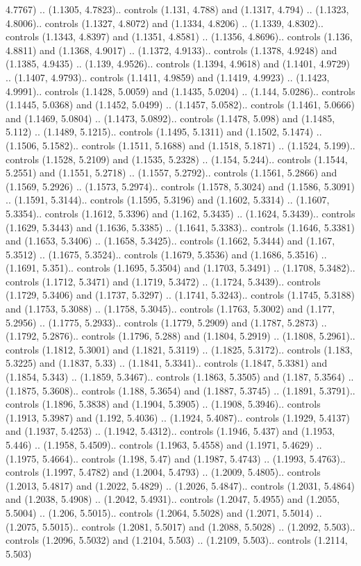 4.7767) .. (1.1305, 4.7823).. controls (1.131, 4.788) and (1.1317, 4.794) .. (1.1323, 4.8006).. controls (1.1327, 4.8072) and (1.1334, 4.8206) .. (1.1339, 4.8302).. controls (1.1343, 4.8397) and (1.1351, 4.8581) .. (1.1356, 4.8696).. controls (1.136, 4.8811) and (1.1368, 4.9017) .. (1.1372, 4.9133).. controls (1.1378, 4.9248) and (1.1385, 4.9435) .. (1.139, 4.9526).. controls (1.1394, 4.9618) and (1.1401, 4.9729) .. (1.1407, 4.9793).. controls (1.1411, 4.9859) and (1.1419, 4.9923) .. (1.1423, 4.9991).. controls (1.1428, 5.0059) and (1.1435, 5.0204) .. (1.144, 5.0286).. controls (1.1445, 5.0368) and (1.1452, 5.0499) .. (1.1457, 5.0582).. controls (1.1461, 5.0666) and (1.1469, 5.0804) .. (1.1473, 5.0892).. controls (1.1478, 5.098) and (1.1485, 5.112) .. (1.1489, 5.1215).. controls (1.1495, 5.1311) and (1.1502, 5.1474) .. (1.1506, 5.1582).. controls (1.1511, 5.1688) and (1.1518, 5.1871) .. (1.1524, 5.199).. controls (1.1528, 5.2109) and (1.1535, 5.2328) .. (1.154, 5.244).. controls (1.1544, 5.2551) and (1.1551, 5.2718) .. (1.1557, 5.2792).. controls (1.1561, 5.2866) and (1.1569, 5.2926) .. (1.1573, 5.2974).. controls (1.1578, 5.3024) and (1.1586, 5.3091) .. (1.1591, 5.3144).. controls (1.1595, 5.3196) and (1.1602, 5.3314) .. (1.1607, 5.3354).. controls (1.1612, 5.3396) and (1.162, 5.3435) .. (1.1624, 5.3439).. controls (1.1629, 5.3443) and (1.1636, 5.3385) .. (1.1641, 5.3383).. controls (1.1646, 5.3381) and (1.1653, 5.3406) .. (1.1658, 5.3425).. controls (1.1662, 5.3444) and (1.167, 5.3512) .. (1.1675, 5.3524).. controls (1.1679, 5.3536) and (1.1686, 5.3516) .. (1.1691, 5.351).. controls (1.1695, 5.3504) and (1.1703, 5.3491) .. (1.1708, 5.3482).. controls (1.1712, 5.3471) and (1.1719, 5.3472) .. (1.1724, 5.3439).. controls (1.1729, 5.3406) and (1.1737, 5.3297) .. (1.1741, 5.3243).. controls (1.1745, 5.3188) and (1.1753, 5.3088) .. (1.1758, 5.3045).. controls (1.1763, 5.3002) and (1.177, 5.2956) .. (1.1775, 5.2933).. controls (1.1779, 5.2909) and (1.1787, 5.2873) .. (1.1792, 5.2876).. controls (1.1796, 5.288) and (1.1804, 5.2919) .. (1.1808, 5.2961).. controls (1.1812, 5.3001) and (1.1821, 5.3119) .. (1.1825, 5.3172).. controls (1.183, 5.3225) and (1.1837, 5.33) .. (1.1841, 5.3341).. controls (1.1847, 5.3381) and (1.1854, 5.343) .. (1.1859, 5.3467).. controls (1.1863, 5.3505) and (1.187, 5.3564) .. (1.1875, 5.3608).. controls (1.188, 5.3654) and (1.1887, 5.3745) .. (1.1891, 5.3791).. controls (1.1896, 5.3838) and (1.1904, 5.3905) .. (1.1908, 5.3946).. controls (1.1913, 5.3987) and (1.192, 5.4036) .. (1.1924, 5.4087).. controls (1.1929, 5.4137) and (1.1937, 5.4253) .. (1.1942, 5.4312).. controls (1.1946, 5.437) and (1.1953, 5.446) .. (1.1958, 5.4509).. controls (1.1963, 5.4558) and (1.1971, 5.4629) .. (1.1975, 5.4664).. controls (1.198, 5.47) and (1.1987, 5.4743) .. (1.1993, 5.4763).. controls (1.1997, 5.4782) and (1.2004, 5.4793) .. (1.2009, 5.4805).. controls (1.2013, 5.4817) and (1.2022, 5.4829) .. (1.2026, 5.4847).. controls (1.2031, 5.4864) and (1.2038, 5.4908) .. (1.2042, 5.4931).. controls (1.2047, 5.4955) and (1.2055, 5.5004) .. (1.206, 5.5015).. controls (1.2064, 5.5028) and (1.2071, 5.5014) .. (1.2075, 5.5015).. controls (1.2081, 5.5017) and (1.2088, 5.5028) .. (1.2092, 5.503).. controls (1.2096, 5.5032) and (1.2104, 5.503) .. (1.2109, 5.503).. controls (1.2114, 5.503) 